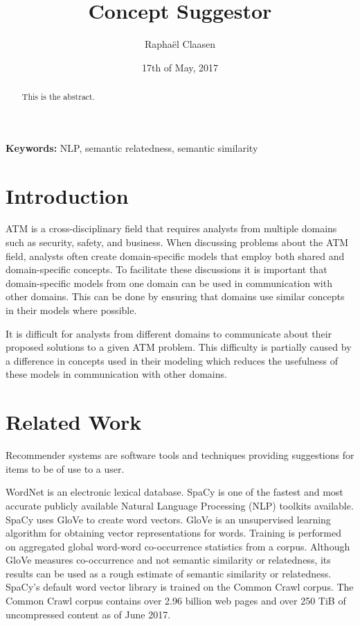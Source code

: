 \documentclass{article}
\title{Concept Suggestor}
\date{17th of May, 2017}
\author{Rapha\"el Claasen}
\begin{document}
\maketitle

\begin{abstract}
This is the abstract.
\end{abstract}

{\bf Keywords:} NLP, semantic relatedness, semantic similarity

\section{Introduction}

ATM is a cross-disciplinary field that requires analysts from multiple domains such as security, safety, and business. When discussing problems about the ATM field, analysts often create domain-specific models that employ both shared and domain-specific concepts. To facilitate these discussions it is important that domain-specific models from one domain can be used in communication with other domains. This can be done by ensuring that domains use similar concepts in their models where possible.

It is difficult for analysts from different domains to communicate about their proposed solutions to a given ATM problem. This difficulty is partially caused by a difference in concepts used in their modeling which reduces the usefulness of these models in communication with other domains.

\section{Related Work}

Recommender systems are software tools and techniques providing suggestions for items to be of use to a user.\cite{ricci2011introduction}

WordNet is an electronic lexical database.\cite{kilgarriff2000wordnet}
SpaCy is one of the fastest and most accurate publicly available Natural Language Processing (NLP) toolkits available.\cite{choi2015depends}
SpaCy uses GloVe to create word vectors. GloVe is an unsupervised learning algorithm for obtaining vector representations for words. Training is performed on aggregated global word-word co-occurrence statistics from a corpus.\cite{pennington2014glove} Although GloVe measures co-occurrence and not semantic similarity or relatedness, its results can be used as a rough estimate of semantic similarity or relatedness.\cite{levy2015improving} SpaCy's default word vector library is trained on the Common Crawl corpus. The Common Crawl corpus contains over 2.96 billion web pages and over 250 TiB of uncompressed content as of June 2017.\cite{nagel2017commoncrawl} %
\end{document}
